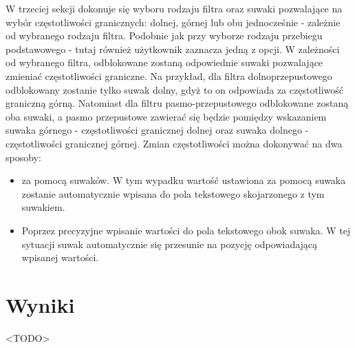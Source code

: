 W trzeciej sekcji dokonuje się wyboru rodzaju filtra oraz suwaki pozwalające na wybór częstotliwości granicznych: dolnej, górnej lub obu jednocześnie - zależnie od wybranego rodzaju filtra. Podobnie jak przy wyborze rodzaju przebiegu podstawowego - tutaj również użytkownik zaznacza jedną z opcji. W zależności od wybranego filtra, odblokowane zostaną odpowiednie suwaki pozwalające zmieniać częstotliwości graniczne. Na przykład, dla filtra dolnoprzepustowego odblokowany zostanie tylko suwak dolny, gdyż to on odpowiada za częstotliwość graniczną górną. Natomiast dla filtru pasmo-przepustowego odblokowane zostaną oba suwaki, a pasmo przepustowe zawierać się będzie pomiędzy wskazaniem suwaka górnego - częstotliwości granicznej dolnej oraz suwaka dolnego - częstotliwości granicznej górnej.
Zmian częstotliwości można dokonywać na dwa sposoby:
\begin{itemize}
	\item za pomocą suwaków. W tym wypadku wartość ustawiona za pomocą suwaka zostanie automatycznie wpisana do pola tekstowego skojarzonego z tym suwakiem.
	\item Poprzez precyzyjne wpisanie wartości do pola tekstowego obok suwaka. W tej sytuacji suwak automatycznie się przesunie na pozycję odpowiadającą wpisanej wartości.
\end{itemize}

\section{Wyniki}
<TODO>
